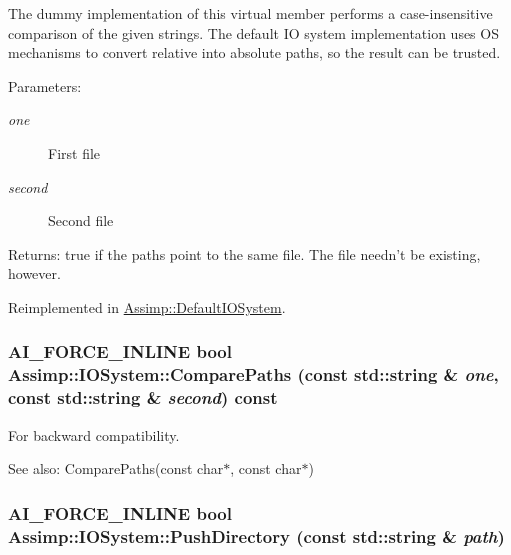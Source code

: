 The dummy implementation of this virtual member performs a case-insensitive comparison of the given strings. The default IO system implementation uses OS mechanisms to convert relative into absolute paths, so the result can be trusted. \begin{Desc}
\item[Parameters:]
\begin{description}
\item[{\em one}]First file \item[{\em second}]Second file \end{description}
\end{Desc}
\begin{Desc}
\item[Returns:]true if the paths point to the same file. The file needn't be existing, however. \end{Desc}


Reimplemented in \hyperlink{class_assimp_1_1_default_i_o_system_0eb1be0b288bdad621f9036bd5290fe7}{Assimp::DefaultIOSystem}.\hypertarget{class_assimp_1_1_i_o_system_39a29f6ee6b76deaa59aed2b7494b182}{
\subsubsection[ComparePaths]{\setlength{\rightskip}{0pt plus 5cm}AI\_\-FORCE\_\-INLINE bool Assimp::IOSystem::ComparePaths (const std::string \& {\em one}, \/  const std::string \& {\em second}) const}}
\label{class_assimp_1_1_i_o_system_39a29f6ee6b76deaa59aed2b7494b182}


For backward compatibility. 

\begin{Desc}
\item[See also:]ComparePaths(const char$\ast$, const char$\ast$) \end{Desc}
\hypertarget{class_assimp_1_1_i_o_system_07c2c93fac300df44c756174fcea71e8}{
\subsubsection[PushDirectory]{\setlength{\rightskip}{0pt plus 5cm}AI\_\-FORCE\_\-INLINE bool Assimp::IOSystem::PushDirectory (const std::string \& {\em path})}}
\label{class_assimp_1_1_i_o_system_07c2c93fac300df44c756174fcea71e8}


